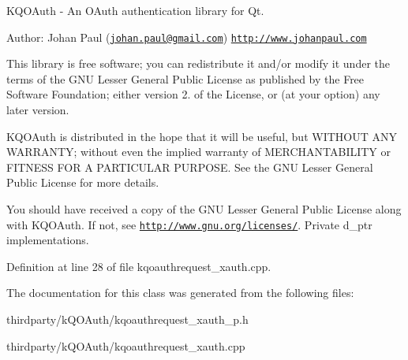 K\+Q\+O\+Auth -\/ An O\+Auth authentication library for Qt.

Author\+: Johan Paul (\href{mailto:johan.paul@gmail.com}{\tt johan.\+paul@gmail.\+com}) \href{http://www.johanpaul.com}{\tt http\+://www.\+johanpaul.\+com}

This library is free software; you can redistribute it and/or modify it under the terms of the G\+NU Lesser General Public License as published by the Free Software Foundation; either version 2. of the License, or (at your option) any later version.

K\+Q\+O\+Auth is distributed in the hope that it will be useful, but W\+I\+T\+H\+O\+UT A\+NY W\+A\+R\+R\+A\+N\+TY; without even the implied warranty of M\+E\+R\+C\+H\+A\+N\+T\+A\+B\+I\+L\+I\+TY or F\+I\+T\+N\+E\+SS F\+OR A P\+A\+R\+T\+I\+C\+U\+L\+AR P\+U\+R\+P\+O\+SE. See the G\+NU Lesser General Public License for more details.

You should have received a copy of the G\+NU Lesser General Public License along with K\+Q\+O\+Auth. If not, see \href{http://www.gnu.org/licenses/}{\tt http\+://www.\+gnu.\+org/licenses/}. Private d\+\_\+ptr implementations. 

Definition at line 28 of file kqoauthrequest\+\_\+xauth.\+cpp.



The documentation for this class was generated from the following files\+:\begin{DoxyCompactItemize}
\item 
thirdparty/k\+Q\+O\+Auth/kqoauthrequest\+\_\+xauth\+\_\+p.\+h\item 
thirdparty/k\+Q\+O\+Auth/kqoauthrequest\+\_\+xauth.\+cpp\end{DoxyCompactItemize}
